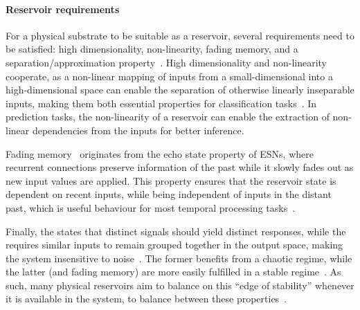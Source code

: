 \paragraph{Reservoir requirements}
For a physical substrate to be suitable as a reservoir, several requirements need to be satisfied: high dimensionality, non-linearity, fading memory, and a separation/approximation property~\cite{appeltant2011information}.
High dimensionality and non-linearity cooperate, as a non-linear mapping of inputs from a small-dimensional into a high-dimensional space can enable the separation of otherwise linearly inseparable inputs, making them both essential properties for classification tasks~\cite{VoltageControlled_SuperparamagneticRC,RC_ASI,appeltant2011information,RC_RecentAdvances}. %
In prediction tasks, the non-linearity of a reservoir can enable the extraction of non-linear dependencies from the inputs for better inference. \par
Fading memory~\cite{boyd1985ApproximatingVolterra} originates from the echo state property of ESNs, where recurrent connections preserve information of the past while it slowly fades out as new input values are applied.
This property ensures that the reservoir state is dependent on recent inputs, while being independent of inputs in the distant past, which is useful behaviour for most temporal processing tasks~\cite{ChaoticTimeSeries_ML,appeltant2011information}. \par %
Finally, the  states that distinct signals should yield distinct responses, while the  requires similar inputs to remain grouped together in the output space, making the system insensitive to noise~\cite{RCbenchmarksReview1}.
The former benefits from a chaotic regime, while the latter (and fading memory) are more easily fulfilled in a stable regime~\cite{RC_RecentAdvances}.
As such, many physical reservoirs aim to balance on this ``edge of stability'' whenever it is available in the system, to balance between these properties~\cite{appeltant2011information}.

